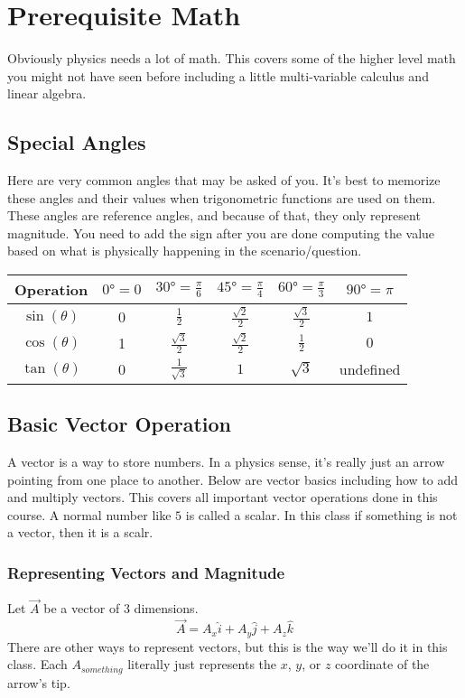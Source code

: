 \section{Prerequisite Math}

Obviously physics needs a lot of math. This covers some of the higher level math you might not have seen before including a little multi-variable
calculus and linear algebra.

\subsection{Special Angles}

Here are very common angles that may be asked of you. It's best to memorize these angles and their
values when trigonometric functions are used on them. These angles are reference angles, and because
of that, they only represent magnitude. You need to add the sign after you are done computing the value based
on what is physically happening in the scenario/question.

\begin{center}
\begin{tabular}{| c | c | c | c | c | c |}
    \hline
    Operation & $\ang{0} = 0 $ & $\ang{30} = \frac{\pi}{6}$ & $\ang{45} = \frac{\pi}{4}$ & $\ang{60} = \frac{\pi}{3}$ & $\ang{90} = \pi$ \\
    \hline
    $\sin (\theta)$ & 0 & $\frac{1}2$ & $\frac{\sqrt{2}}{2}$ & $\frac{\sqrt{3}}{2}$ & $1$ \\
    \hline
    $\cos (\theta)$ & 1 & $\frac{\sqrt{3}}{2}$ & $\frac{\sqrt{2}}{2}$ & $\frac{1}2$ & $0$ \\
    \hline
    $\tan (\theta)$ & 0 & $\frac{1}{\sqrt{3}}$ & $1$ & $\sqrt{3}$ & undefined \\
    \hline
\end{tabular}
\end{center}

\subsection{Basic Vector Operation}
A vector is a way to store numbers. In a physics sense, it's really just an arrow pointing from one place to another. Below are vector basics
including how to add and multiply vectors. This covers all important vector operations done in this course. A normal number like \( 5 \) is
called a scalar. In this class if something is not a vector, then it is a scalr.

\subsubsection{Representing Vectors and Magnitude}
Let $\vec{A}$ be a vector of 3 dimensions.
\begin{equation}
    \vec{A} =  A_x \hat{i} + A_y \hat{j} + A_z \hat{k}
\end{equation}
There are other ways to represent vectors, but this is the way we'll do it in this class. Each \(A_{something}\) literally just represents the
$x$, $y$, or $z$ coordinate of the arrow's tip.

